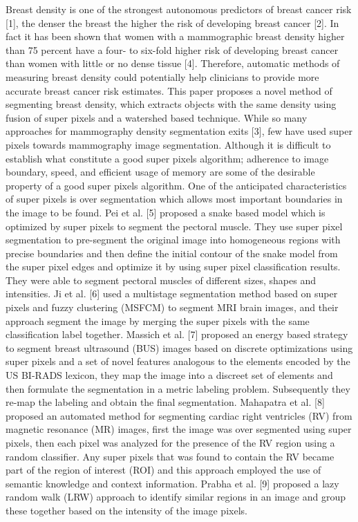 \documentclass{article}
\begin{document}
{\normalsize Breast density is one of the strongest autonomous predictors of breast cancer risk [1], the denser the breast the higher the risk of developing breast cancer [2]. In fact it has been shown that women with a mammographic breast density higher than 75 percent have a four- to six-fold higher risk of developing breast cancer than women with little or no dense tissue [4]. Therefore, automatic methods of measuring breast density could potentially help clinicians to provide more accurate breast cancer risk estimates. This paper proposes a novel method of segmenting breast density, which extracts objects with the same density using fusion of super pixels and a watershed based technique.
While so many approaches for mammography density segmentation exits [3], few have used super pixels towards mammography image segmentation. Although it is difficult to establish what constitute a good super pixels algorithm; adherence to image boundary, speed, and efficient usage of memory are some of the desirable property of a good super pixels algorithm. One of the anticipated characteristics of super pixels is over segmentation which allows most important boundaries in the image to be found. 
Pei et al. [5] proposed a snake based model which is optimized by super pixels to segment the pectoral muscle. They use super pixel segmentation to pre-segment the original image into homogeneous regions with precise boundaries and then define the initial contour of the snake model from the super pixel edges and optimize it by using super pixel classification results. They were able to segment pectoral muscles of different sizes, shapes and intensities. Ji et al. [6] used a multistage segmentation method based on super pixels and fuzzy clustering (MSFCM) to segment MRI brain images, and their approach segment the image by merging the super pixels with the same classification label together. 
Massich et al. [7] proposed an energy based strategy to segment breast ultrasound (BUS) images based on discrete optimizations using super pixels and a set of novel features analogous to the elements encoded by the US BI-RADS lexicon, they map the image into a discreet set of elements and then formulate the segmentation in a metric labeling problem. Subsequently they re-map the labeling and obtain the final segmentation.
Mahapatra et al. [8]  proposed an automated method for segmenting cardiac right ventricles (RV) from magnetic resonance (MR) images, first the image was over segmented using super pixels, then each pixel was analyzed for the presence of the RV region using a random classifier. Any super pixels that was found to contain the RV became part of the region of interest (ROI) and this approach employed the use of semantic knowledge and context information. Prabha et al. [9] proposed a lazy random walk (LRW) approach to identify similar regions in an image and group these together based on the intensity of the image pixels. }
\end{document}
